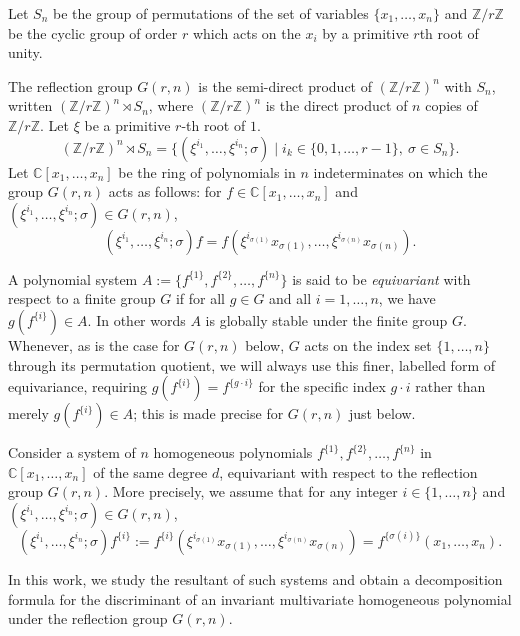 \documentclass[12pt]{amsart}
\theoremstyle{definition}
\begin{document}
Let $S_n$ be the group of permutations of the set of variables $\{x_1,\dots,x_n\}$ and $\mathbb{Z}/r\mathbb{Z}$ be the cyclic group of order $r$ which acts on the $x_i$ by a primitive $r$th root of unity.

The reflection group $G(r,n)$ is the semi-direct product of $(\mathbb{Z}/r\mathbb{Z})^n$ with $S_n$, written $(\mathbb{Z}/r\mathbb{Z})^n \rtimes S_n$, where $(\mathbb{Z}/r\mathbb{Z})^n$ is the direct product of $n$ copies of $\mathbb{Z}/r\mathbb{Z}$. Let $\xi$ be a primitive $r$-th root of $1$.
\[
(\mathbb{Z}/r\mathbb{Z})^n \rtimes S_n = \{ (\xi^{i_1},\dots,\xi^{i_n};\sigma) \mid i_k \in \{0,1,\dots,r-1\},\ \sigma \in S_n \}.
\]
Let $\mathbb{C}[x_1,\dots,x_n]$ be the ring of polynomials in $n$ indeterminates on which the group $G(r,n)$ acts as follows: for $f \in \mathbb{C}[x_1,\dots,x_n]$ and $(\xi^{i_1},\dots,\xi^{i_n};\sigma) \in G(r,n)$,
\[
(\xi^{i_1},\dots,\xi^{i_n};\sigma)f = f(\xi^{i_{\sigma(1)}}x_{\sigma(1)},\dots,\xi^{i_{\sigma(n)}}x_{\sigma(n)}).
\]

A polynomial system $A := \{f^{\{1\}}, f^{\{2\}}, \dots, f^{\{n\}}\}$ is said to be \emph{equivariant} with respect to a finite group $G$ if for all $g \in G$ and all $i = 1,\dots,n$, we have $g(f^{\{i\}}) \in A$. In other words $A$ is globally stable under the finite group $G$. Whenever, as is the case for $G(r,n)$ below, $G$ acts on the index set $\{1,\dots,n\}$ through its permutation quotient, we will always use this finer, labelled form of equivariance, requiring $g(f^{\{i\}}) = f^{\{g\cdot i\}}$ for the specific index $g\cdot i$ rather than merely $g(f^{\{i\}}) \in A$; this is made precise for $G(r,n)$ just below.

Consider a system of $n$ homogeneous polynomials $f^{\{1\}}, f^{\{2\}}, \dots, f^{\{n\}}$ in $\mathbb{C}[x_1,\dots,x_n]$ of the same degree $d$, equivariant with respect to the reflection group $G(r,n)$. More precisely, we assume that for any integer $i \in \{1,\dots,n\}$ and $(\xi^{i_1},\dots,\xi^{i_n};\sigma) \in G(r,n)$,
\[
(\xi^{i_1},\dots,\xi^{i_n};\sigma)f^{\{i\}} := f^{\{i\}}(\xi^{i_{\sigma(1)}}x_{\sigma(1)},\dots,\xi^{i_{\sigma(n)}}x_{\sigma(n)}) = f^{\{\sigma(i)\}}(x_1,\dots,x_n).
\]

In this work, we study the resultant of such systems and obtain a decomposition formula for the discriminant of an invariant multivariate homogeneous polynomial under the reflection group $G(r,n)$.
\end{document}
